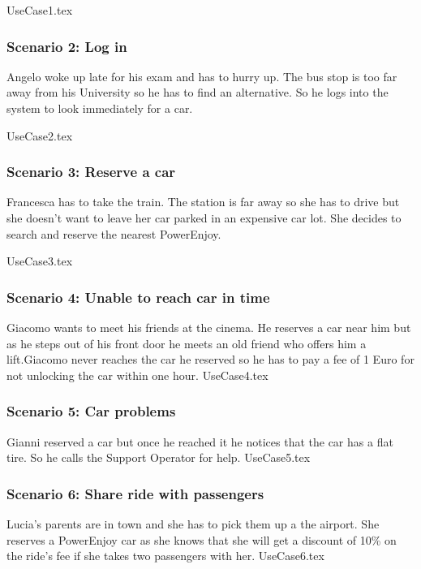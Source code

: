 \documentclass[12pt]{article}
\begin{document}
 	 	\FloatBarrier
		{UseCase1.tex} 	 	
		\newpage
 	 	
		\subsubsection{Scenario 2: Log in}
		Angelo woke up late for his exam and has to hurry up. The bus stop is too far away 
		from his University so he has to find an alternative. So he logs into the system to
		look immediately for a car.
		
		\FloatBarrier
		{UseCase2.tex}
		\newpage
		
		\subsubsection{Scenario 3: Reserve a car}
		Francesca has to take the train. The station is far away so she has to drive but she
		doesn't want to leave her car parked in an expensive car lot. She decides to search 
		and reserve the nearest PowerEnjoy.
		
		\FloatBarrier
		{UseCase3.tex}
		\newpage
		 
		\subsubsection{Scenario 4: Unable to reach car in time}
		Giacomo wants to meet his friends at the cinema. He reserves a car near him but as he 
		steps out of his front door he meets an old friend who offers him a lift.Giacomo
		never reaches the car he reserved so he has to pay a fee of 1 Euro for not unlocking
		the car within one hour.
		\FloatBarrier
		{UseCase4.tex}
		\newpage
		
		\subsubsection{Scenario 5: Car problems}
		Gianni reserved a car but once he reached it he notices that the car has a flat
		tire. So he calls the Support Operator for help.
		\FloatBarrier
		{UseCase5.tex}
		\newpage
		
		\subsubsection{Scenario 6: Share ride with passengers}
		Lucia's parents are in town and she has to pick them up a the airport. She reserves
		a PowerEnjoy car as she knows that she will get a discount of 10\% on the ride's fee
		if she takes two passengers with her.
		\FloatBarrier
		{UseCase6.tex}
		\newpage
		
\end{document}
